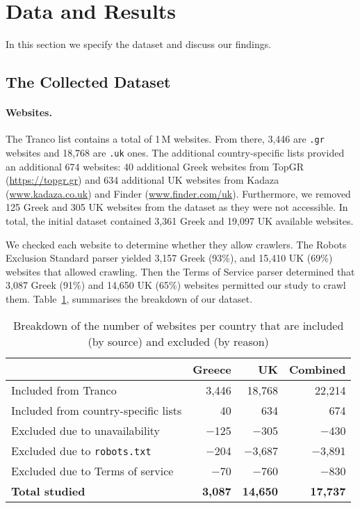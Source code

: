 
\section{Data and Results}

In this section we specify the dataset and discuss our findings. 

\subsection{The Collected Dataset}
\label{sec:dataset}

\paragraph{Websites.}
The Tranco list contains a total of 1\,M websites. From there, 3,446 are \texttt{.gr} websites and 18,768 are \texttt{.uk} ones. The additional country-specific lists provided an additional 674 websites: 40 additional Greek websites from TopGR (\url{https://topgr.gr}) and 634 additional UK websites from Kadaza (\url{www.kadaza.co.uk}) and Finder (\url{www.finder.com/uk}). Furthermore, we removed 125 Greek and 305 UK websites from the dataset as they were not accessible. In total, the initial dataset contained 3,361 Greek and 19,097 UK available websites. 

We checked each website to determine whether they allow crawlers. The Robots Exclusion Standard parser yielded 3,157 Greek (93\%), and 15,410 UK (69\%) websites that allowed crawling. Then the Terms of Service parser determined that 3,087 Greek (91\%) and 14,650 UK (65\%) websites permitted our study to crawl them. Table~\ref{tab:data_websites}, summarises the breakdown of our dataset.

\begin{table}[t]
    \centering
    \caption{Breakdown of the number of websites per country that are included (by source) and excluded (by reason)}
    \begin{tabular}{@{}l@{\quad}r@{\quad}r@{\quad}r@{}}
    \toprule
        & \textbf{Greece}   & \textbf{UK}       & \textbf{Combined} \\ 
    \midrule
    Included from Tranco 
        & 3,446             & 18,768            & 22,214            \\
    Included from country-specific lists 
        & 40                & 634               & 674               \\
    Excluded due to unavailability 
        & $-$125            & $-$305            & $-$430              \\

    Excluded due to \texttt{robots.txt} 
        & $-$204            & $-$3,687          & $-$3,891          \\
    Excluded due to Terms of service 
        & $-$70             & $-$760            & $-$830            \\
    \midrule 
    \textbf{Total studied} 
        & \textbf{3,087}    & \textbf{14,650}   & \textbf{17,737}   \\ 
    \bottomrule
    \end{tabular}
    \label{tab:data_websites}
\end{table}

